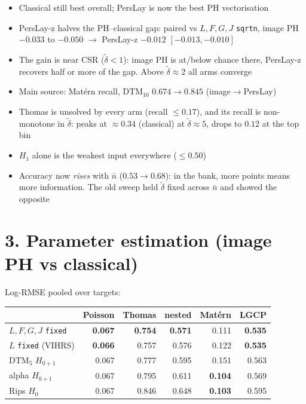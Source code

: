 \documentclass[10pt]{article}
\newcommand{\dt}{\tilde\delta}
\newcommand{\nb}{\bar n}
\begin{document}
\begin{itemize}
  \item Classical still best overall; PersLay is now the best PH vectorisation
  \item PersLay-z halves the PH--classical gap: paired vs $L,F,G,J$ \texttt{sqrtn}, image PH $-0.033$ to $-0.050$ $\to$ PersLay-z $-0.012$ $[-0.013,-0.010]$
  \item The gain is near CSR ($\dt<1$): image PH is at/below chance there, PersLay-z recovers half or more of the gap. Above $\dt\approx2$ all arms converge
  \item Main source: Mat\'ern recall, DTM$_{10}$ $0.674\to0.845$ (image$\to$PersLay)
  \item Thomas is unsolved by every arm (recall $\le0.17$), and its recall is non-monotone in $\dt$: peaks at $\approx0.34$ (classical) at $\dt\approx5$, drops to $0.12$ at the top bin
  \item $H_1$ alone is the weakest input everywhere ($\le0.50$)
  \item Accuracy now \emph{rises} with $\nb$ ($0.53\to0.68$): in the bank, more points means more information. The old sweep held $\dt$ fixed across $\nb$ and showed the opposite
\end{itemize}

\section*{3. Parameter estimation (image PH vs classical)}

Log-RMSE pooled over targets:

\smallskip
{\small
\begin{tabular}{@{}lrrrrr@{}}
\toprule
 & Poisson & Thomas & nested & Mat\'ern & LGCP \\
\midrule
$L,F,G,J$ \texttt{fixed}           & \textbf{0.067} & \textbf{0.754} & \textbf{0.571} & 0.111 & \textbf{0.535} \\
$L$ \texttt{fixed} (VIHRS)         & \textbf{0.066} & 0.757 & 0.576 & 0.122 & \textbf{0.535} \\
DTM$_5$ $H_{0+1}$                  & 0.067 & 0.777 & 0.595 & 0.151 & 0.563 \\
alpha $H_{0+1}$                    & 0.067 & 0.795 & 0.611 & \textbf{0.104} & 0.569 \\
Rips $H_0$                         & 0.067 & 0.846 & 0.648 & \textbf{0.103} & 0.595 \\
\bottomrule
\end{tabular}
}
\end{document}
